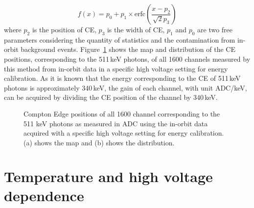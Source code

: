 \documentclass[preprint,sort&compress,12pt]{elsarticle}
\begin{document}
\begin{equation}\label{equ:CE}
f(x) = p_0 + p_1 \times \mathrm{erfc}\left(\frac{x - p_2}{\sqrt{2}p_3}\right)
\end{equation}
where $p_2$ is the position of CE, $p_3$ is the width of CE, $p_1$ and $p_0$ are two free parameters considering the quantity of statistics and the contamination from in-orbit background events. Figure~\ref{fig:CE_pos} shows the map and distribution of the CE positions, corresponding to the 511\,keV photons, of all 1600 channels measured by this method from in-orbit data in a specific high voltage setting for energy calibration. As it is known that the energy corresponding to the CE of 511\,keV photons is approximately 340\,keV, the gain of each channel, with unit ADC/keV, can be acquired by dividing the CE position of the channel by 340\,keV.

\begin{figure}[!ht]
\centering
{}
\caption{Compton Edge positions of all 1600 channel corresponding to the 511 keV photons as measured in ADC using the in-orbit data acquired with a specific high voltage setting for energy calibration. (a) shows the map and (b) shows the distribution.}\label{fig:CE_pos}
\end{figure}

\newpage

\section{Temperature and high voltage dependence}\label{sec:temp_hv_dependence}
\end{document}
